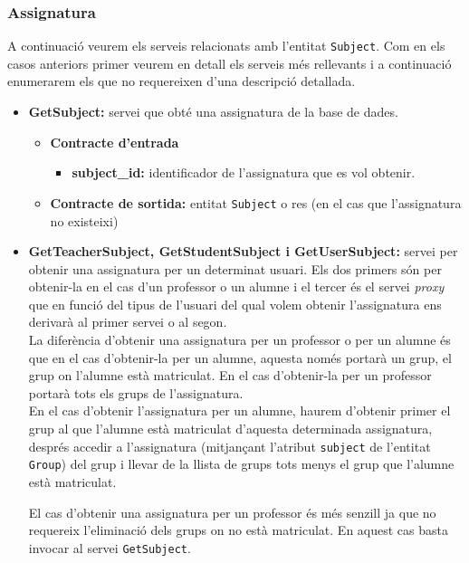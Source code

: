 		\subsubsection{Assignatura}
		
		A continuació veurem els serveis relacionats amb l'entitat \texttt{Subject}. Com en els casos anteriors primer veurem en detall els serveis més rellevants i a continuació enumerarem els que no requereixen d'una descripció detallada.
		
		\begin{itemize}
			\item \textbf{GetSubject:} servei que obté una assignatura de la base de dades.
				\begin{itemize}
					\item \textbf{Contracte d'entrada}
						\begin{itemize}
							\item \textbf{subject\_id:} identificador de l'assignatura que es vol obtenir.
						\end{itemize}
					\item \textbf{Contracte de sortida:} entitat \texttt{Subject} o res (en el cas que l'assignatura no existeixi)
				\end{itemize}
				
			\item \textbf{GetTeacherSubject, GetStudentSubject i GetUserSubject:} servei per obtenir una assignatura per un determinat usuari. Els dos primers són per obtenir-la en el cas d'un professor o un alumne i el tercer és el servei \emph{proxy} que en funció del tipus de l'usuari del qual volem obtenir l'assignatura ens derivarà al primer servei o al segon. \\
			
			La diferència d'obtenir una assignatura per un professor o per un alumne és que en el cas d'obtenir-la per un alumne, aquesta només portarà un grup, el grup on l'alumne està matriculat. En el cas d'obtenir-la per un professor portarà tots els grups de l'assignatura.\\
			
			En el cas d'obtenir l'assignatura per un alumne, haurem d'obtenir primer el grup al que l'alumne està matriculat d'aquesta determinada assignatura, després accedir a l'assignatura (mitjançant l'atribut \texttt{subject} de l'entitat \texttt{Group}) del grup i llevar de la llista de grups tots menys el grup que l'alumne està matriculat.
			
			El cas d'obtenir una assignatura per un professor és més senzill ja que no requereix l'eliminació dels grups on no està matriculat. En aquest cas basta invocar al servei \texttt{GetSubject}.\\
			

\end{itemize}
